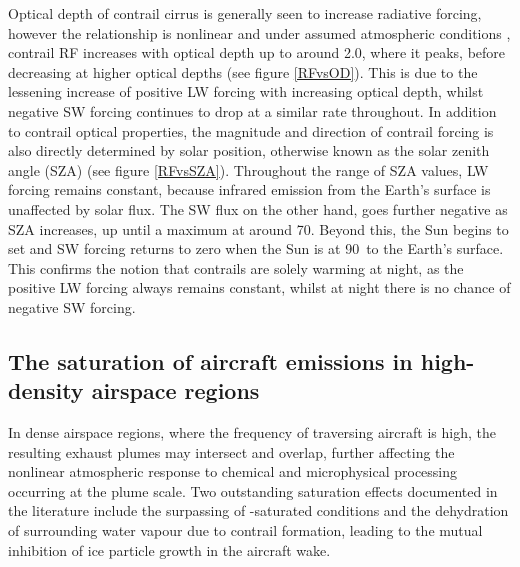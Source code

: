 Optical depth of contrail cirrus is generally seen to increase radiative forcing, however the relationship is nonlinear and under assumed atmospheric conditions \cite{Meerkotter1999, Schumann2012b}, contrail RF increases with optical depth up to around 2.0, where it peaks, before decreasing at higher optical depths (see figure \ref{RFvsOD}). This is due to the lessening increase of positive LW forcing with increasing optical depth, whilst negative SW forcing continues to drop at a similar rate throughout. In addition to contrail optical properties, the magnitude and direction of contrail forcing is also directly determined by solar position, otherwise known as the solar zenith angle (SZA) (see figure \ref{RFvsSZA}). Throughout the range of SZA values, LW forcing remains constant, because infrared emission from the Earth's surface is unaffected by solar flux. The SW flux on the other hand, goes further negative as SZA increases, up until a maximum at around 70\textdegree. Beyond this, the Sun begins to set and SW forcing returns to zero when the Sun is at 90\textdegree \ to the Earth's surface. This confirms the notion that contrails are solely warming at night, as the positive LW forcing always remains constant, whilst at night there is no chance of negative SW forcing.


\subsection{The saturation of aircraft emissions in high-density airspace regions}
\label{Saturation}
In dense airspace regions, where the frequency of traversing aircraft is high, the resulting exhaust plumes may intersect and overlap, further affecting the nonlinear atmospheric response to chemical and microphysical processing occurring at the plume scale. Two outstanding saturation effects documented in the literature include the surpassing of -saturated conditions and the dehydration of surrounding water vapour due to contrail formation, leading to the mutual inhibition of ice particle growth in the aircraft wake.

